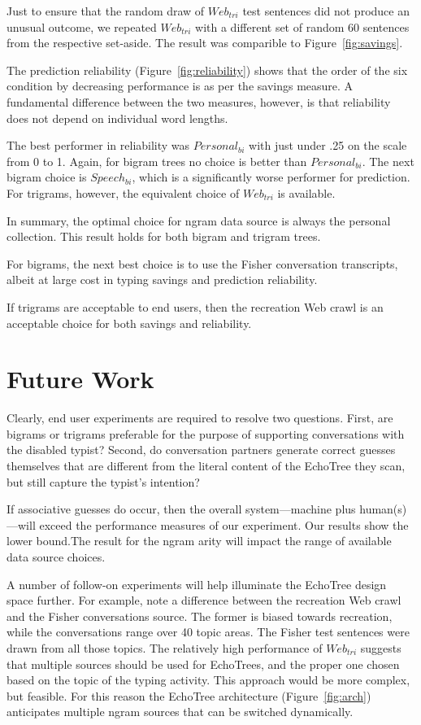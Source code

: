 \documentclass{sigchi}
\begin{document}
Just to ensure that the random draw of $Web_{tri}$ test sentences did
not produce an unusual outcome, we repeated $Web_{tri}$ with a
different set of random 60 sentences from the respective
set-aside. The result was comparible to Figure~\ref{fig:savings}.

The prediction reliability (Figure~\ref{fig:reliability}) shows that
the order of the six condition by decreasing performance is as per the
savings measure. A fundamental difference between the two measures,
however, is that reliability does not depend on individual word
lengths. 

The best performer in reliability was $Personal_{bi}$ with just under
.25 on the scale from 0 to 1. Again, for bigram trees no choice is
better than $Personal_{bi}$. The next bigram choice is $Speech_{bi}$,
which is a significantly worse performer for prediction. For trigrams,
however, the equivalent choice of $Web_{tri}$ is available.

In summary, the optimal choice for ngram data source is always the
personal collection. This result holds for both bigram and trigram
trees. 

For bigrams, the next best choice is to use the Fisher
conversation transcripts, albeit at large cost in typing savings and
prediction reliability.

If trigrams are acceptable to end users, then the recreation Web crawl
is an acceptable choice for both savings and reliability.

\section{Future Work}

Clearly, end user experiments are required to resolve two
questions. First, are bigrams or trigrams preferable for the purpose
of supporting conversations with the disabled typist? Second, do
conversation partners generate correct guesses themselves that are
different from the literal content of the EchoTree they scan, but
still capture the typist's intention? 

If associative guesses do occur, then the overall system---machine
plus human(s)---will exceed the performance measures of our
experiment. Our results show the lower bound.The result for the ngram
arity will impact the range of available data source choices.

A number of follow-on experiments will help illuminate the EchoTree
design space further. For example, note a difference between the
recreation Web crawl and the Fisher conversations source. The former
is biased towards recreation, while the conversations range over 40
topic areas. The Fisher test sentences were drawn from all those
topics. The relatively high performance of $Web_{tri}$ suggests that
multiple sources should be used for EchoTrees, and the proper one
chosen based on the topic of the typing activity. This approach would
be more complex, but feasible. For this reason the EchoTree
architecture (Figure~\ref{fig:arch}) anticipates multiple ngram
sources that can be switched dynamically.
\end{document}
